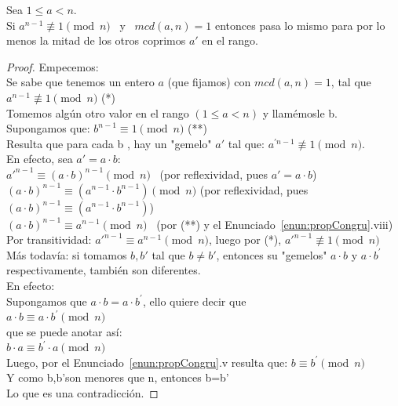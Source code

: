 \begin{enunciado} \label{enun:lematestigosFermat}\leavevmode\par
Sea $1 \leq a < n$. \\
Si $a^{n-1} \not\equiv 1 \pmod n$ \, y \, $mcd(a,n)=1$ entonces pasa lo mismo para por lo menos la mitad de los otros coprimos $a'$ en el rango.
\end{enunciado}

\begin{proof} Empecemos: \\
Se sabe que tenemos un entero $a$ (que fijamos) con $mcd(a, n)=1$, tal que \\
$a^{n-1} \not \equiv 1\pmod n$  \quad\quad\quad\quad\quad\quad\quad\quad\quad\quad\quad (*) \\
Tomemos algún otro valor en el rango $(1 \leq a<n)$ y llamémosle b.\\
Supongamos que: $b^{n-1} \equiv 1\pmod n$ \quad\quad\quad\quad (**) \\ 
Resulta que para cada b , hay un "gemelo" $a'$ tal que: $a^{'n-1} \not \equiv 1\pmod n$. \\
En efecto, sea $a'=a \cdot b$: \\
$a'^{n-1} \equiv(a \cdot b)^{n-1} \pmod n$ \quad\quad\quad\quad\, (por reflexividad, pues $a'=a \cdot b$) \\
$(a \cdot b)^{n-1} \equiv (a^{n-1} \cdot b^{n-1}) \pmod n$ \quad (por reflexividad, pues $(a \cdot b)^{n-1} \equiv(a^{n-1} \cdot b^{n-1})$) \\
$(a \cdot b)^{n-1} \equiv a^{n-1}\pmod n$ \quad\quad\quad\quad\, (por (**) y el Enunciado~\ref{enun:propCongru}.viii)  \\
Por transitividad: $a'^{n-1} \equiv a^{n-1}\pmod n$, luego por (*), $a'^{n-1} \not\equiv 1\pmod n$\\
Más todavía: si tomamos $b, b'$ tal que $b \neq b'$, entonces su "gemelos" $a \cdot b$ y $a \cdot b^{\prime}$ respectivamente, también son diferentes.\\
En efecto:\\
Supongamos que $a \cdot b=a \cdot b^{\prime}$, ello quiere decir que\\
$a \cdot b \equiv a \cdot b^{\prime}\pmod n$\\
que se puede anotar así:\\
$b \cdot a \equiv b^{\prime} \cdot a\pmod n$\\
Luego, por el Enunciado~\ref{enun:propCongru}.v resulta que: $b \equiv b^{\prime}\pmod n$\\
Y como b,b'son menores que n, entonces b=b'\\
Lo que es una contradicción.
\end{proof}


